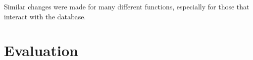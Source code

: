 \documentclass{paper}
\begin{document}




Similar changes were made for many different functions, especially for those that interact with the database.

\section{Evaluation}
\label{sec:eval}


\label{mylastpage}
\newpage
\pagestyle{frontorback}

\newpage
\listoffigures
\vspace{1cm}
\listofsnippets
\vspace{1cm}
{}
\printbibliography
\thispagestyle{frontorback}
\end{document}
